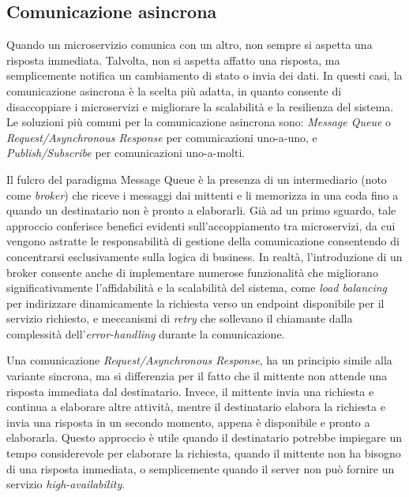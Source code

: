 \subsection{Comunicazione asincrona}
Quando un microservizio comunica con un altro, non sempre si aspetta una risposta immediata. Talvolta, non si aspetta affatto una risposta, ma semplicemente notifica un cambiamento di stato o invia dei dati. In questi casi, la comunicazione asincrona è la scelta più adatta, in quanto consente di disaccoppiare i microservizi e migliorare la scalabilità e la resilienza del sistema.
Le soluzioni più comuni per la comunicazione asincrona sono: \emph{Message Queue} o \emph{Request/Asynchronous Response} per comunicazioni uno-a-uno, e \emph{Publish/Subscribe} per comunicazioni uno-a-molti.

Il fulcro del paradigma Message Queue è la presenza di un intermediario (noto come \emph{broker}) che riceve i messaggi dai mittenti e li memorizza in una coda fino a quando un destinatario non è pronto a elaborarli. Già ad un primo sguardo, tale approccio conferisce benefici evidenti sull'accoppiamento tra microservizi, da cui vengono astratte le responsabilità di gestione della comunicazione consentendo di concentrarsi esclusivamente sulla logica di business. In realtà, l'introduzione di un broker consente anche di implementare numerose funzionalità che migliorano significativamente l'affidabilità e la scalabilità del sistema, come \emph{load balancing} per indirizzare dinamicamente la richiesta verso un endpoint disponibile per il servizio richiesto, e meccanismi di \emph{retry} che sollevano il chiamante dalla complessità dell'\emph{error-handling} durante la comunicazione.

Una comunicazione \emph{Request/Asynchronous Response}, ha un principio simile alla variante sincrona, ma si differenzia per il fatto che il mittente non attende una risposta immediata dal destinatario. Invece, il mittente invia una richiesta e continua a elaborare altre attività, mentre il destinatario elabora la richiesta e invia una risposta in un secondo momento, appena è disponibile e pronto a elaborarla. Questo approccio è utile quando il destinatario potrebbe impiegare un tempo considerevole per elaborare la richiesta, quando il mittente non ha bisogno di una risposta immediata, o semplicemente quando il server non può fornire un servizio \emph{high-availability}.

